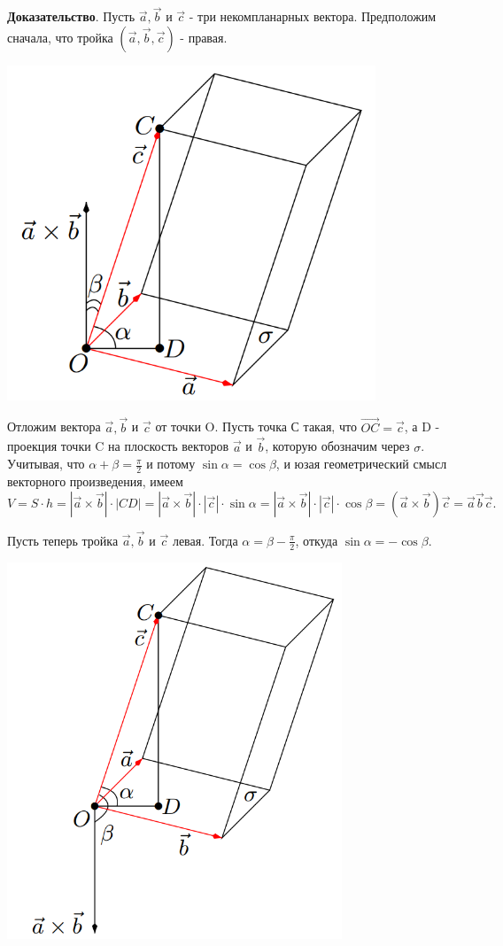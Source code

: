 \documentclass[a4paper]{article}
\begin{document}
    \begin{hproof}
        \textbf{Доказательство}. Пусть $\vec{a}, \vec{b}$ и $\vec{c}$ - три некомпланарных вектора. Предположим сначала, что тройка $(\vec{a}, \vec{b}, \vec{c})$ - правая.

        \includegraphics[width=11cm]{t4}


        Отложим вектора $\vec{a}, \vec{b}$ и $\vec{c}$ от точки O. Пусть точка С такая, что $\overrightarrow{OC} = \vec{c}$, а D - проекция точки C на плоскость векторов $\vec{a}$ и $\vec{b}$, которую обозначим через $\sigma$. Учитывая, что $\alpha + \beta = \frac{\pi}{2}$ и потому $\sin \alpha = \cos \beta$, и юзая геометрический смысл векторного произведения, имеем
        \begin{equation}
            V = S \cdot h =  | \vec{a} \times \vec{b} | \cdot | CD | = |\vec{a} \times \vec{b}| \cdot | \vec{c} | \cdot \sin \alpha = |\vec{a} \times \vec{b}| \cdot | \vec{c} | \cdot \cos \beta = ( \vec{a} \times \vec{b}) \vec{c} = \vec{a} \vec{b} \vec{c}.
        \end{equation}

        Пусть теперь тройка $\vec{a}, \vec{b}$ и $\vec{c}$ левая. Тогда $\alpha = \beta - \frac{\pi}{2}$, откуда $\sin \alpha = - \cos \beta$.

        \includegraphics[width=10cm]{t5}


\end{hproof}
\end{document}

